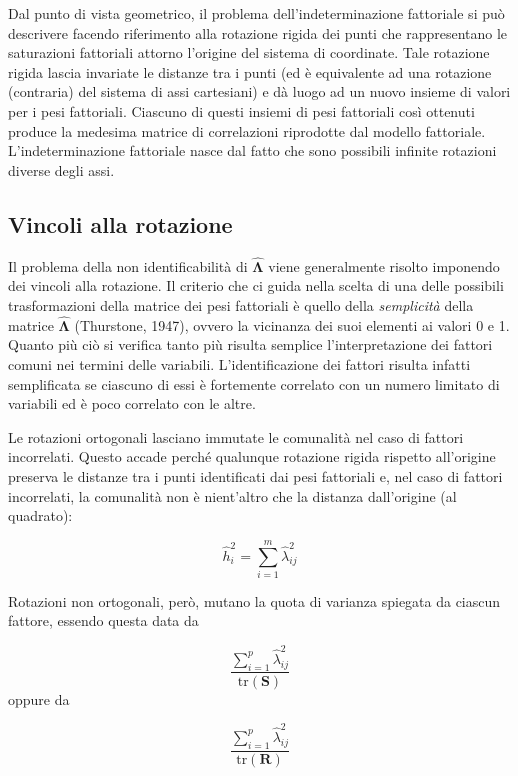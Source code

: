 \documentclass[
  11pt,
]{krantz}
\theoremstyle{definition}
\theoremstyle{definition}
\theoremstyle{definition}
\theoremstyle{definition}
\theoremstyle{remark}
\begin{document}
Dal punto di vista geometrico, il problema dell'indeterminazione fattoriale si può descrivere facendo riferimento alla rotazione rigida dei punti che rappresentano le saturazioni fattoriali attorno l'origine del sistema di coordinate. Tale rotazione rigida lascia invariate le distanze tra i punti (ed è equivalente ad una rotazione (contraria) del sistema di assi cartesiani) e dà luogo ad un nuovo insieme di valori per i pesi fattoriali. Ciascuno di questi insiemi di pesi fattoriali così ottenuti produce la medesima matrice di correlazioni riprodotte dal modello fattoriale. L'indeterminazione fattoriale nasce dal fatto che sono possibili infinite rotazioni diverse degli assi.

\hypertarget{vincoli-alla-rotazione}{%
\subsection{Vincoli alla rotazione}\label{vincoli-alla-rotazione}}

Il problema della non identificabilità di \(\hat{\boldsymbol{\Lambda}}\) viene generalmente risolto imponendo dei vincoli alla rotazione. Il criterio che ci guida nella scelta di una delle possibili trasformazioni della matrice dei pesi fattoriali è quello della \emph{semplicità} della matrice \(\hat{\boldsymbol{\Lambda}}\) (Thurstone, 1947), ovvero la vicinanza dei suoi elementi ai valori 0 e 1. Quanto più ciò si verifica tanto più risulta semplice l'interpretazione dei fattori comuni nei termini delle variabili. L'identificazione dei fattori risulta infatti semplificata se ciascuno di essi è fortemente correlato con un numero limitato di variabili ed è poco correlato con le altre.

Le rotazioni ortogonali lasciano immutate le comunalità nel caso di fattori incorrelati. Questo accade perché qualunque rotazione rigida rispetto all'origine preserva le distanze tra i punti identificati dai pesi fattoriali e, nel caso di fattori incorrelati, la comunalità non è nient'altro che la distanza dall'origine (al quadrato):

\[\hat{h}^2_i = \sum_{i=1}^m \hat{\lambda}_{ij}^2\]

Rotazioni non ortogonali, però, mutano la quota di varianza spiegata da ciascun fattore, essendo questa data da

\[\frac{\sum_{i=1}^p \hat{\lambda}_{ij}^2}{\text{tr}(\textbf{S})}\] oppure da

\[\frac{\sum_{i=1}^p \hat{\lambda}_{ij}^2}{\text{tr}(\textbf{R})}\]
\end{document}
